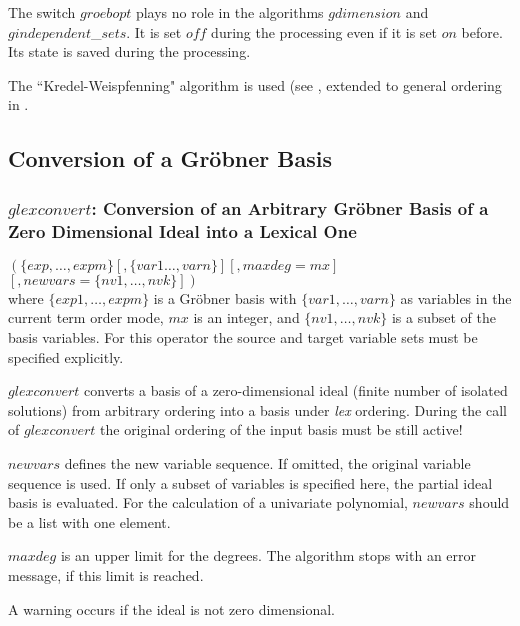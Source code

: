 The switch $groebopt$ plays no role in the algorithms $gdimension$ and
$gindependent$\_$sets$. It is set $off$ during the processing even if
it is set $on$ before. Its state is saved during the processing.

The ``Kredel-Weispfenning" algorithm is used (see \cite{Kredel:88a},
extended to general ordering in \cite{BeWei:93}.

\subsection{Conversion of a Gr\"obner Basis}

\subsubsection{$glexconvert$: Conversion of an Arbitrary Gr\"obner Basis
of a Zero Dimensional Ideal into a Lexical One}
\begin{description}
\item[{\it glexconvert}] $ \left(\{exp,\ldots , expm\} \left[,\{var1
\ldots , varn\}\right]\left[,maxdeg=mx\right]\right.$ \\
$\left.\left[,newvars=\{nv1, \ldots , nvk\}\right]\right) $ \\
where $\{exp1, \ldots , expm\}$ is a Gr\"obner basis with
$\{var1, \ldots , varn\}$ as variables in the current term order mode,
$mx$ is an integer, and
$\{nv1, \ldots , nvk\}$ is a subset of the basis variables.
For this operator the source and target variable sets must be specified
explicitly.
\end{description}

$glexconvert$ converts a basis of a zero-dimensional ideal (finite number
of isolated solutions) from arbitrary ordering into a basis under {\it
lex} ordering. During the call of $glexconvert$ the original ordering of
the input basis must be still active!

$newvars$ defines the new variable sequence. If omitted, the
original variable sequence is used. If only a subset of variables is
specified here, the partial ideal basis is evaluated. For the
calculation of a univariate polynomial, $new$\-$vars$ should be a list
with one element.

$maxdeg$ is an upper limit for the degrees. The algorithm stops with
an error message, if this limit is reached.

A warning occurs if the ideal is not zero dimensional.


